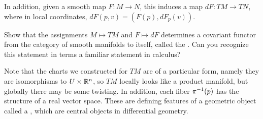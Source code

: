 %
In addition, given a smooth map $F : M \to N$, this induces a map
$dF : TM \to TN$, where in local coordinates, $dF(p,v) = (F(p), dF_p(v))$.
%
\begin{exer}
Show that the assignments $M \mapsto TM$ and $F \mapsto dF$ determines
a covariant functor from the category of smooth manifolds to itself,
called the . Can you recognize this statement in
terms a familiar statement in calculus?
\end{exer}
%
Note that the charts we constructed for $TM$ are of a particular form,
namely they are isomorphisms to $U \times \mathbb{R}^n$, so $TM$ locally looks
like a product manifold, but globally there may be some twisting. In
addition, each fiber $\pi^{-1}(p)$ has the structure of a real vector
space. These are defining features of a geometric object called a
, which are central objects in differential geometry.
%

